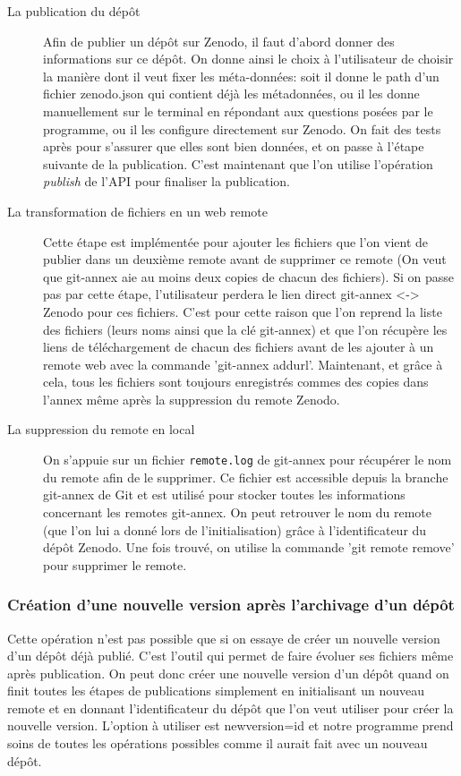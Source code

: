 \documentclass[11pt]{article}
\begin{document}
\begin{description}
\item[{La publication du dépôt}] Afin de publier un dépôt sur Zenodo, il faut d'abord donner des
informations sur ce dépôt. On donne ainsi le choix à l'utilisateur
de choisir la manière dont il veut fixer les méta-données: soit il
donne le path d'un fichier zenodo.json qui contient déjà les
métadonnées, ou il les donne manuellement sur le terminal en
répondant aux questions posées par le programme, ou il les configure
directement sur Zenodo. On fait des tests après pour s'assurer que
elles sont bien données, et on passe à l'étape suivante de la
publication. C'est maintenant que l'on utilise l'opération \emph{publish}
de l'API pour finaliser la publication.

\item[{La transformation de fichiers en un web remote}] Cette étape est implémentée pour ajouter les fichiers que l'on vient
de publier dans un deuxième remote avant de supprimer ce remote (On
veut que git-annex aie au moins deux copies de chacun des
fichiers). Si on passe pas par cette étape, l'utilisateur perdera le
lien direct git-annex <-> Zenodo pour ces fichiers.
C'est pour cette raison que l'on reprend la liste des fichiers
(leurs noms ainsi que la clé git-annex) et que l'on récupère les
liens de téléchargement de chacun des fichiers avant de les ajouter
à un remote web avec la commande 'git-annex addurl'.
Maintenant, et grâce à cela, tous les fichiers sont toujours
enregistrés commes des copies dans l'annex même après la suppression
du remote Zenodo.

\item[{La suppression du remote en local}] On s'appuie sur un fichier \texttt{remote.log} de git-annex pour récupérer le
nom du remote afin de le supprimer. Ce fichier est accessible depuis
la branche git-annex de Git et est utilisé pour stocker toutes les
informations concernant les remotes git-annex.
On peut retrouver le nom du remote (que l'on lui a donné lors de
l'initialisation) grâce à l'identificateur du dépôt Zenodo. Une fois
trouvé, on utilise la commande 'git remote remove' pour supprimer le
remote.
\end{description}

\subsubsection{Création d'une nouvelle version après l'archivage d'un dépôt}
\label{sec:orgc24c91d}
Cette opération n'est pas possible que si on essaye de créer un
nouvelle version d'un dépôt déjà publié. C'est l'outil qui permet de
faire évoluer ses fichiers même après publication.
On peut donc créer une nouvelle version d'un dépôt quand on finit
toutes les étapes de publications simplement en initialisant un
nouveau remote et en donnant l'identificateur du dépôt que l'on veut
utiliser pour créer la nouvelle version.
L'option à utiliser est newversion=id et notre programme prend soins
de toutes les opérations possibles comme il aurait fait avec un
nouveau dépôt. 
\end{document}
